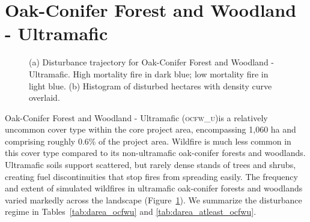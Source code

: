 \clearpage
\section{Oak-Conifer Forest and Woodland - Ultramafic} 
\begin{figure}[!htbp]
  \centering
  \caption{\small (a) Disturbance trajectory for Oak-Conifer Forest and Woodland - Ultramafic. High mortality fire in dark blue; low mortality fire in light blue. (b) Histogram of disturbed hectares with density curve overlaid.} 
  \label{fig:darea_ocfwu}
\end{figure}

Oak-Conifer Forest and Woodland - Ultramafic (\textsc{ocfw\_u})is a relatively uncommon cover type within the core project area, encompassing 1,060 ha and comprising roughly 0.6\% of the project area. Wildfire is much less common in this cover type compared to its non-ultramafic oak-conifer forests and woodlands. Ultramafic soils support scattered, but rarely dense stands of trees and shrubs, creating fuel discontinuities that stop fires from spreading easily. The frequency and extent of simulated wildfires in ultramafic oak-conifer forests and woodlands varied markedly across the landscape (Figure~\ref{fig:darea_ocfwu}). We summarize the disturbance regime in Tables~\ref{tab:darea_ocfwu} and \ref{tab:darea_atleast_ocfwu}.


